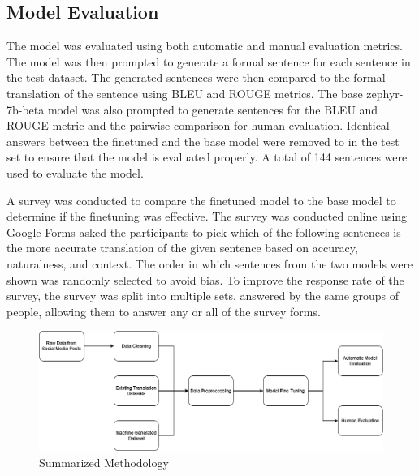 \subsection{Model Evaluation}
The model was evaluated using both automatic and manual evaluation metrics. The model was then prompted to generate a formal sentence for each sentence in the test dataset. The generated sentences were then compared to the formal translation of the sentence using BLEU and ROUGE metrics. The base zephyr-7b-beta model was also prompted to generate sentences for the BLEU and ROUGE metric and the pairwise comparison for human evaluation. Identical answers between the finetuned and the base model were removed to in the test set to ensure that the model is evaluated properly. A total of 144 sentences were used to evaluate the model.

A survey was conducted to compare the finetuned model to the base model to determine if the finetuning was effective. The survey was conducted online using Google Forms asked the participants to pick which of the following sentences is the more accurate translation of the given sentence based on accuracy, naturalness, and context. The order in which sentences from the two models were shown was randomly selected to avoid bias. To improve the response rate of the survey, the survey was split into multiple sets, answered by the same groups of people, allowing them to answer any or all of the survey forms.

\begin{figure}[H]
	\centering
	\includegraphics[scale=0.5]{figures/methodology.png}
	\caption{Summarized Methodology}
\end{figure}